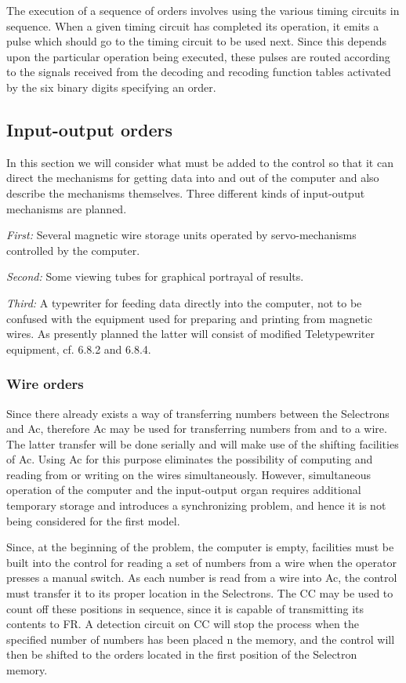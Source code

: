 \documentclass[12pt]{amsart}
\begin{document}
The execution of a sequence of orders involves using the various timing circuits in sequence. When a given timing circuit has completed its operation, it emits a pulse which should go to the timing circuit to be used next. Since this depends upon the particular operation being executed, these pulses are routed according to the signals received from the decoding and recoding function tables activated by the six binary digits specifying an order.

\subsection{Input-output orders}
In this section we will consider what must be added to the control so that it can direct the mechanisms for getting data into and out of the computer and also describe the mechanisms themselves. Three different kinds of input-output mechanisms are planned.

\emph{First:} Several magnetic wire storage units operated by servo-mechanisms controlled by the computer.

\emph{Second:} Some viewing tubes for graphical portrayal of results.

\emph{Third:} A typewriter for feeding data directly into the computer, not to be confused with the equipment used for preparing and printing from magnetic wires. As presently planned the latter will consist of modified Teletypewriter equipment, cf. 6.8.2 and 6.8.4.

\subsubsection{Wire orders}
Since there already exists a way of transferring numbers between the Selectrons and Ac, therefore Ac may be used for transferring numbers from and to a wire. The latter transfer will be done serially and will make use of the shifting facilities of Ac. Using Ac for this purpose eliminates the possibility of computing and reading from or writing on the wires simultaneously. However, simultaneous operation of the computer and the input-output organ requires additional temporary storage and introduces a synchronizing problem, and hence it is not being considered for the first model.

Since, at the beginning of the problem, the computer is empty, facilities must be built into the control for reading a set of numbers from a wire when the operator presses a manual switch. As each number is read from a wire into Ac, the control must transfer it to its proper location in the Selectrons. The CC may be used to count off these positions in sequence, since it is capable of transmitting its contents to FR. A detection circuit on CC will stop the process when the specified number of numbers has been placed n the memory, and the control will then be shifted to the orders located in the first position of the Selectron memory.
\end{document}
